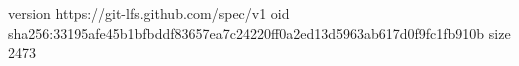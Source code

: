version https://git-lfs.github.com/spec/v1
oid sha256:33195afe45b1bfbddf83657ea7c24220ff0a2ed13d5963ab617d0f9fc1fb910b
size 2473
